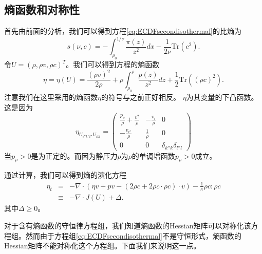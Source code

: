 \subsection{熵函数和对称性}
首先由前面的分析，我们可以得到方程\eqref{eq:ECDFsecondisothermal}的比熵为
\begin{equation*}
	s (\nu, c ) =  -\int_{\rho_0}^{1/\nu} \frac{\pi(z)}{z^2} dx - \frac{1}{2 \nu}  \mbox{Tr} (c^2).
\end{equation*}
令$U = (\rho, \rho v, \rho c)^T$。我们可以得到方程的熵函数
\begin{equation*}
	\eta = \eta(U) = \frac{(\rho v)^2}{2\rho}+\rho \int_{\rho_0}^{\rho} \frac{p(z)}{z^2} dz + \frac{1}{2}  \mbox{Tr} \left((\rho c)^2\right).
\end{equation*}
注意我们在这里采用的熵函数$\eta$的符号与之前正好相反。%
$\eta$为其变量的下凸函数。这是因为
\begin{equation*}
	\eta_{U_{i''k''l''}U_{ikl}} = \left( \begin{array}{ccc} 
		\frac{p_\rho}{\rho} + \frac{v^2}{\rho} & -\frac{v_i}{\rho} & 0 \\
		-\frac{v_{i''}}{\rho} & \frac{1}{\rho} & 0 \\
		0 & 0 & \delta_{k''k}\delta_{l''l}
	\end{array}\right)
\end{equation*}
当$p_\rho>0$是为正定的。而因为静压力$p$为$\rho$的单调增函数$p_\rho>0$成立。

通过计算，我们可以得到熵的演化方程
\begin{eqnarray}\label{23}
	\eta_t &=&  - \nabla \cdot ( \eta v+ p v - (2\rho c + 2 \rho c \cdot \rho c) \cdot v) - \frac{1}{\kappa} \rho c: \rho c \nonumber\\
  &\equiv& -\nabla \cdot J(U) + \Delta.	
\end{eqnarray}
其中$\Delta \ge 0$。

对于含有熵函数的守恒律方程组\cite{friedrichs1971systems}，我们知道熵函数的Hessian矩阵可以对称化该方程组。然而由于方程组\eqref{eq:ECDFsecondisothermal}不是守恒形式，熵函数的Hessian矩阵不能对称化这个方程组。下面我们来说明这一点。

